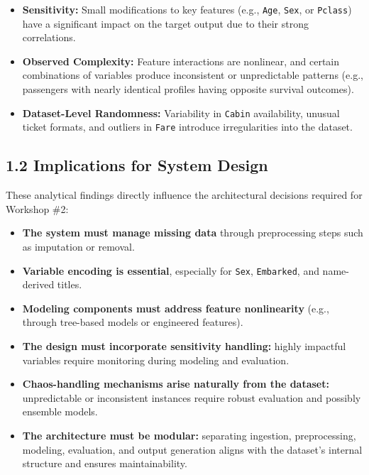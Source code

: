 \documentclass[12pt]{report}
\begin{document}
\begin{itemize}
    \item \textbf{Sensitivity:}
    Small modifications to key features (e.g., \texttt{Age}, \texttt{Sex}, or \texttt{Pclass})
    have a significant impact on the target output due to their strong correlations.

    \item \textbf{Observed Complexity:}
    Feature interactions are nonlinear, and certain combinations of variables produce
    inconsistent or unpredictable patterns (e.g., passengers with nearly identical
    profiles having opposite survival outcomes).

    \item \textbf{Dataset-Level Randomness:}
    Variability in \texttt{Cabin} availability, unusual ticket formats, and outliers in
    \texttt{Fare} introduce irregularities into the dataset.
\end{itemize}

\subsection*{1.2 Implications for System Design}

These analytical findings directly influence the architectural decisions required for
Workshop \#2:

\begin{itemize}
    \item \textbf{The system must manage missing data} through preprocessing steps such as
    imputation or removal.

    \item \textbf{Variable encoding is essential}, especially for \texttt{Sex}, \texttt{Embarked},
    and name-derived titles.

    \item \textbf{Modeling components must address feature nonlinearity}
    (e.g., through tree-based models or engineered features).

    \item \textbf{The design must incorporate sensitivity handling:}
    highly impactful variables require monitoring during modeling and evaluation.

    \item \textbf{Chaos-handling mechanisms arise naturally from the dataset:}
    unpredictable or inconsistent instances require robust evaluation and possibly
    ensemble models.

    \item \textbf{The architecture must be modular:}
    separating ingestion, preprocessing, modeling, evaluation, and output generation
    aligns with the dataset’s internal structure and ensures maintainability.
\end{itemize}
\end{document}
